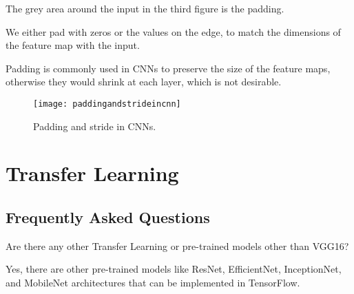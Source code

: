 	\begin{bulletedlist}
		\item The grey area around the input in the third figure is the padding.
		\item We either pad with zeros or the values on the edge, to match the dimensions of the feature map with the input.
		\item Padding is commonly used in CNNs to preserve the size of the feature maps, otherwise they would shrink at each layer, which is not desirable.
	\end{bulletedlist}

	\begin{figure}[h]
		\centering
		\texttt{[image: paddingandstrideincnn]}
		\caption[Padding and stride in CNNs]{Padding and stride in CNNs.}
		\label{fig:paddingandstrideincnn}
	\end{figure}


	\section{Transfer Learning}
	\subsection{Frequently Asked Questions}
	\begin{qanda}
		\begin{question}
Are there any other Transfer Learning or pre-trained models other than VGG16?
		\end{question}
		\begin{answer}
Yes, there are other pre-trained models like ResNet, EfficientNet, InceptionNet, and MobileNet architectures that can be implemented in TensorFlow.
		\end{answer}
	\end{qanda}

